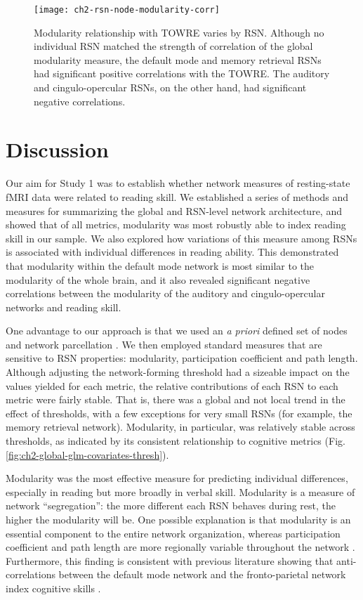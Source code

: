 \begin{figure}[t]
    \centering
    \texttt{[image: ch2-rsn-node-modularity-corr]}
    \caption[Modularity relationship with TOWRE varies by RSN.] {Modularity relationship with TOWRE varies by RSN. Although no individual RSN matched the strength of correlation of the global modularity measure, the default mode and memory retrieval RSNs had significant positive correlations with the TOWRE. The auditory and cingulo-opercular RSNs, on the other hand, had significant negative correlations.}
    \label{fig:ch2-rsn-node-modularity-corr}
\end{figure}

\section{Discussion}

Our aim for Study 1 was to establish whether network measures of resting-state fMRI data were related to reading skill. We established a series of methods and measures for summarizing the global and RSN-level network architecture, and showed that of all metrics, modularity was most robustly able to index reading skill in our sample. We also explored how variations of this measure among RSNs is associated with individual differences in reading ability. This demonstrated that modularity within the default mode network is most similar to the modularity of the whole brain, and it also revealed significant negative correlations between the modularity of the auditory and cingulo-opercular networks and reading skill.

One advantage to our approach is that we used an \textit{a priori} defined set of nodes and network parcellation \citep{Power2013}. We then employed standard measures that are sensitive to RSN properties: modularity, participation coefficient and path length. Although adjusting the network-forming threshold had a sizeable impact on the values yielded for each metric, the relative contributions of each RSN to each metric were fairly stable. That is, there was a global and not local trend in the effect of thresholds, with a few exceptions for very small RSNs (for example, the memory retrieval network). Modularity, in particular, was relatively stable across thresholds, as indicated by its consistent relationship to cognitive metrics (Fig. \ref{fig:ch2-global-glm-covariates-thresh}).

Modularity was the most effective measure for predicting individual differences, especially in reading but more broadly in verbal skill. Modularity is a measure of network ``segregation'': the more different each RSN behaves during rest, the higher the modularity will be. One possible explanation is that modularity is an essential component to the entire network organization, whereas participation coefficient and path length are more regionally variable throughout the network \citep{Bullmore2012}. Furthermore, this finding is consistent with previous literature showing that anti-correlations between the default mode network and the fronto-parietal network index cognitive skills \citep{Anticevic2012}. 

